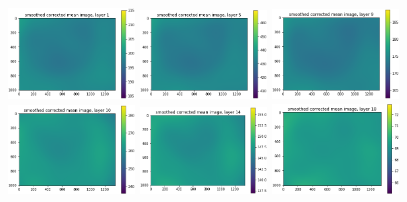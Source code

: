 \documentclass[letterpaper,11pt]{article}
\begin{document}
\begin{figure}[!ht]
\centering
\includegraphics[width=0.3\textwidth]{images/results/smoothed_corrected_mean_image_layers/smoothed_corrected_mean_image_layer_1_same_scale}
\includegraphics[width=0.3\textwidth]{images/results/smoothed_corrected_mean_image_layers/smoothed_corrected_mean_image_layer_5_same_scale}
\includegraphics[width=0.3\textwidth]{images/results/smoothed_corrected_mean_image_layers/smoothed_corrected_mean_image_layer_9_same_scale}
\includegraphics[width=0.3\textwidth]{images/results/smoothed_corrected_mean_image_layers/smoothed_corrected_mean_image_layer_10_same_scale}
\includegraphics[width=0.3\textwidth]{images/results/smoothed_corrected_mean_image_layers/smoothed_corrected_mean_image_layer_14_same_scale}
\includegraphics[width=0.3\textwidth]{images/results/smoothed_corrected_mean_image_layers/smoothed_corrected_mean_image_layer_18_same_scale}

\end{figure}
\end{document}
